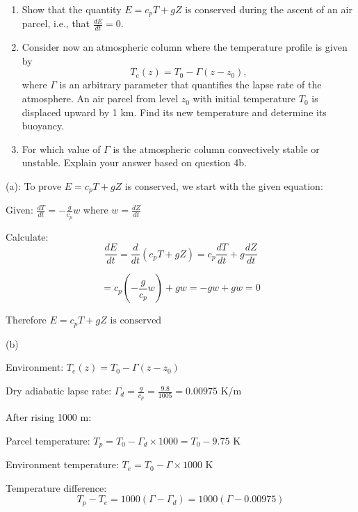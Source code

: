 \documentclass[letterpaper, 11pt]{article}
\newcommand{\1}{\mathds{1}}	%
\theoremstyle{definition}
\begin{document}
\begin{enumerate}
    \item[(a)] Show that the quantity $E = c_pT + gZ$ is conserved during the ascent of an air parcel, i.e., that $\frac{dE}{dt} = 0$.
    
    \item[(b)] Consider now an atmospheric column where the temperature profile is given by
    \begin{equation*}
    T_e(z) = T_0 - \Gamma(z - z_0),
    \end{equation*}
    where $\Gamma$ is an arbitrary parameter that quantifies the lapse rate of the atmosphere. An air parcel from level $z_0$ with initial temperature $T_0$ is displaced upward by 1 km. Find its new temperature and determine its buoyancy.
    
    \item[(c)] For which value of $\Gamma$ is the atmospheric column convectively stable or unstable. Explain your answer based on question 4b.
\end{enumerate}
(a): 
To prove $E = c_pT + gZ$ is conserved, we start with the given equation:

Given: $\frac{dT}{dt} = -\frac{g}{c_p}w$ where $w = \frac{dZ}{dt}$

Calculate:
\begin{equation*}
\frac{dE}{dt} = \frac{d}{dt}(c_pT + gZ) = c_p\frac{dT}{dt} + g\frac{dZ}{dt}
\end{equation*}

\begin{equation*}
= c_p\left(-\frac{g}{c_p}w\right) + gw = -gw + gw = 0
\end{equation*}

Therefore $E = c_pT + gZ \text{ is conserved}$

(b)

Environment: $T_e(z) = T_0 - \Gamma(z - z_0)$

Dry adiabatic lapse rate: $\Gamma_d = \frac{g}{c_p} = \frac{9.8}{1005} = 0.00975$ K/m

After rising 1000 m:

Parcel temperature: $T_p = T_0 - \Gamma_d \times 1000 = T_0 - 9.75$ K

Environment temperature: $T_e = T_0 - \Gamma \times 1000$ K

Temperature difference:
\begin{equation*}
T_p - T_e = 1000(\Gamma - \Gamma_d) = 1000(\Gamma - 0.00975)
\end{equation*}
\end{document}
